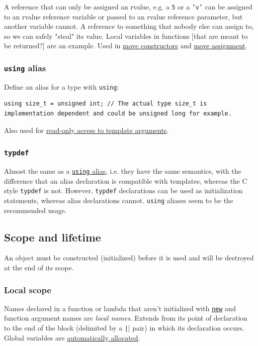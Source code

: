 \documentclass[table, xcdraw]{article}%
\begin{document}
A reference that can only be assigned an rvalue, e.g. a \texttt{5} or a \texttt{'v'} can be assigned to an rvalue reference variable or passed to an rvalue reference parameter, but another variable cannot. A reference to something that nobody else can assign to, so we can safely "steal" its value. Local variables in functions [that are meant to be returned?] are an example. Used in \hyperref[moveconstructor]{move constructors} and \hyperref[moveassignment]{move assignment}.

\subsubsection{\texttt{using} alias} \label{alias}

Define an alias for a type with \texttt{using}:

\begin{verbatim}
using size_t = unsigned int; // The actual type size_t is implementation dependent and could be unsigned long for example.
\end{verbatim}

Also used for \hyperref[readonlyaccesstotemplatearguments]{read-only access to template arguments}.

\subsubsection{\texttt{typdef}} \label{typedef}

Almost the same as a \hyperref[alias]{\texttt{using} alias}, i.e. they have the same semantics, with the difference that an alias declaration is compatible with templates, whereas the C style \texttt{typdef} is not. However, \texttt{typdef} declarations can be used as initialization statements, whereas alias declarations cannot. \texttt{using} aliases seem to be the recommended usage.

\subsection{Scope and lifetime}

An object must be constructed (initialized) before it is used and will be destroyed at the end of its scope.

\subsubsection{Local scope} \label{localscope}
Names declared in a function or lambda that aren't initialized with \hyperref[new]{\texttt{new}} and function argument names are \textit{local names}. Extends from its point of declaration to the end of the block (delimited by a \texttt|{}| pair) in which its declaration occurs. Global variables are \hyperref[automaticallocation]{automatically allocated}.
\end{document}
